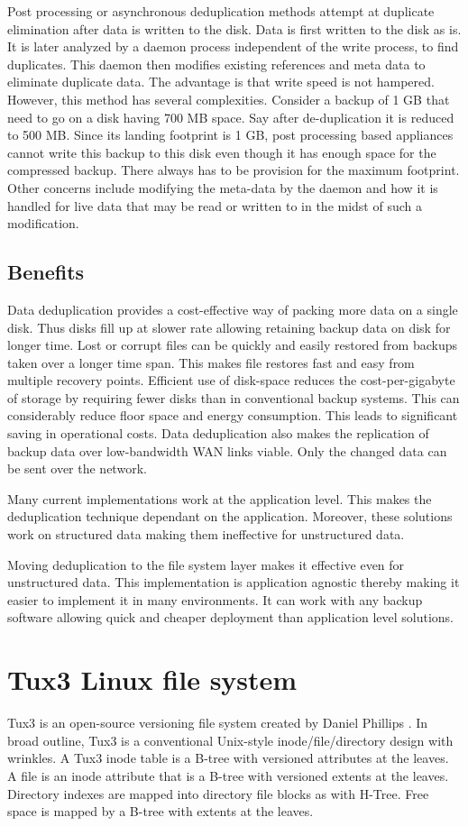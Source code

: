 \documentclass[final]{ols}
\begin{document}
Post processing or asynchronous deduplication methods attempt at duplicate elimination after data is written to the disk. Data is first written to the disk as is. It is later analyzed by a daemon process independent of the write process, to find duplicates. This daemon then modifies existing references and meta data to eliminate duplicate data. The advantage is that write speed is not hampered. However, this method has several complexities. Consider a backup of 1 GB that need to go on a disk having 700 MB space. Say after de-duplication it is reduced to 500 MB. Since its landing footprint is 1 GB, post processing based appliances cannot write this backup to this disk even though it has enough space for the compressed backup. There always has  to be provision for the maximum footprint. Other concerns include modifying the meta-data by the daemon and how it is handled for live data that may be read or written to in the midst of such a modification.

\subsection{Benefits}
Data deduplication provides a cost-effective way of packing more data on a single disk. Thus disks fill up at slower rate allowing retaining backup data on disk for longer time. Lost or corrupt files can be quickly and easily restored from backups taken over a longer time span. This makes file restores fast and easy from multiple recovery points. Efficient use of disk-space reduces the cost-per-gigabyte of storage by requiring fewer disks than in conventional backup systems. This can considerably reduce floor space and energy consumption. This leads to significant saving in operational costs. Data deduplication also makes the replication of backup data over low-bandwidth WAN links viable. Only the changed data can be sent over the network. 

Many current implementations work at the application level. This makes the deduplication technique dependant on the application. Moreover, these solutions work on structured data making them ineffective for unstructured data. 

Moving deduplication to the file system layer makes it effective even for unstructured data. This implementation is application agnostic thereby making it easier to implement it in many environments. It can work with any backup software allowing quick and cheaper deployment than application level solutions. 

\section{Tux3 Linux file system}
Tux3 is an open-source versioning file system created by Daniel Phillips \cite{4}. In broad outline, Tux3 is a conventional Unix-style inode/file/directory design with wrinkles. A Tux3 inode table is a B-tree with versioned attributes at the leaves. A file is an inode attribute that is a B-tree with versioned extents at the leaves. Directory indexes are mapped into directory file blocks as with H-Tree. Free space is mapped by a B-tree with extents at the leaves.
\end{document}
